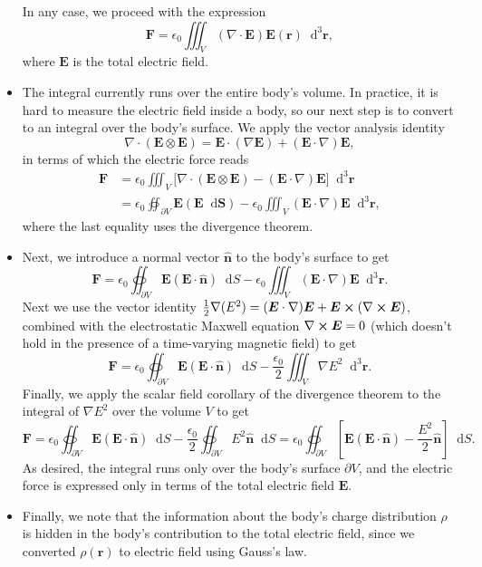 \documentclass[11pt, a4paper]{article}
\newcommand{\diff}{\mathop{}\!\mathrm{d}} %
\newcommand{\dr}{\diff^{3} \r}  %
\renewcommand{\vec}[1]{\bm{#1}} %
\newcommand{\uvec}[1]{\hat{\vec{#1}}} %
\renewcommand{\r}{\vec{r}}
\newcommand{\E}{\vec{E}} %
\newcommand{\ee}{\epsilon_{0}}  %
\renewcommand{\div}{\nabla \cdot}
\renewcommand{\curl}{\nabla \cross}
\renewcommand{\grad}{\nabla}
\begin{document}
\begin{itemize}
	In any case, we proceed with the expression
	\begin{equation*}
		\vec{F} = \ee \iiint_{V} (\div \E) \E(\r) \dr,
	\end{equation*}
	where $ \E $ is the total electric field.
	

	\item The integral currently runs over the entire body's volume. In practice, it is hard to measure the electric field inside a body, so our next step is to convert to an integral over the body's surface. We apply the vector analysis identity
	\begin{equation*}
		\div (\E \otimes \E) = \E \cdot (\grad \E) + (\E \cdot \grad) \E,
	\end{equation*}
	in terms of which the electric force reads
	\begin{align*}
		\vec{F} &= \ee \iiint_{V} \big[\div (\E \otimes \E) - (\E \cdot \grad) \E \big] \dr \\
		& = \ee \oiint_{\partial V} \E(\E \diff \vec{S}) - \ee \iiint_{V}(\E \cdot \grad)\E \dr,
	\end{align*}
	where the last equality uses the divergence theorem. 
	
	\item Next, we introduce a normal vector $ \uvec{n} $ to the body's surface to get
	\begin{equation*}
		\vec{F} = \ee \oiint_{\partial V} \E (\E \cdot \uvec{n}) \diff S - \ee \iiint_{V} (\E \cdot \grad)\E \dr.
	\end{equation*}
	Next we use the vector identity $ \frac{1}{2} \grad (E^{2}) = (\E \cdot \grad)\E + \E \cross (\curl \E) $, combined with the electrostatic Maxwell equation $ \curl \E = 0 $ (which doesn't hold in the presence of a time-varying magnetic field) to get
	\begin{equation*}
		\vec{F} = \ee \oiint_{\partial V} \E (\E \cdot \uvec{n}) \diff S - \frac{\ee}{2} \iiint_{V} \grad E^{2}\dr.
	\end{equation*}
	Finally, we apply the scalar field corollary of the divergence theorem to the integral of $ \grad E^{2} $ over the volume $ V $ to get
	\begin{equation*}
		\vec{F} = \ee \oiint_{\partial V} \E (\E \cdot \uvec{n}) \diff S - \frac{\ee}{2} \oiint_{\partial V}E^{2}\uvec{n} \diff S = \ee \oiint_{\partial V} \left[\E(\E\cdot \uvec{n}) - \frac{E^{2}}{2}\uvec{n} \right] \diff S.
	\end{equation*}
	As desired, the integral runs only over the body's surface $ \partial V $, and the electric force is expressed only in terms of the total electric field $ \E $.
	
	\item Finally, we note that the information about the body's charge distribution $ \rho $ is hidden in the body's contribution to the total electric field, since we converted $ \rho(\r) $ to electric field using Gauss's law.
	
\end{itemize}
\end{document}
